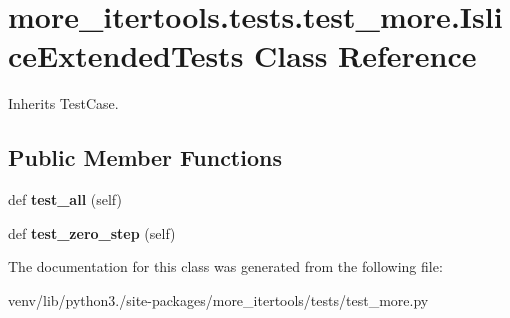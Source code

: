 \hypertarget{classmore__itertools_1_1tests_1_1test__more_1_1_islice_extended_tests}{}\section{more\+\_\+itertools.\+tests.\+test\+\_\+more.\+Islice\+Extended\+Tests Class Reference}
\label{classmore__itertools_1_1tests_1_1test__more_1_1_islice_extended_tests}


Inherits Test\+Case.

\subsection*{Public Member Functions}
\begin{DoxyCompactItemize}
\item 
\mbox{\label{classmore__itertools_1_1tests_1_1test__more_1_1_islice_extended_tests_a6632f2fdf679788b9ccad181cd0af795}} 
def {\bfseries test\+\_\+all} (self)
\item 
\mbox{\label{classmore__itertools_1_1tests_1_1test__more_1_1_islice_extended_tests_adade7948c86bae0b1b33ef10e2d8309f}} 
def {\bfseries test\+\_\+zero\+\_\+step} (self)
\end{DoxyCompactItemize}


The documentation for this class was generated from the following file\+:\begin{DoxyCompactItemize}
\item 
venv/lib/python3./site-\/packages/more\+\_\+itertools/tests/test\+\_\+more.\+py\end{DoxyCompactItemize}
